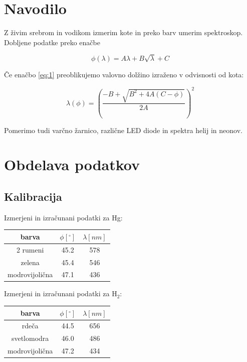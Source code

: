 \documentclass[12pt]{report}
\begin{document}
\chapter*{Navodilo}

Z živim srebrom in vodikom izmerim kote in preko barv umerim spektroskop. Dobljene podatke preko enačbe 

\begin{equation}\label{eq:1}
  \phi (\lambda) = A \lambda + B \sqrt{\lambda} +C
\end{equation}

Če enačbo \ref{eq:1} preoblikujemo valovno dolžino izraženo v odvisnosti od kota:

\begin{equation}
  \lambda(\phi) =\left(\frac{-B + \sqrt{B^2 + 4A(C - \phi)}}{2A}\right)^2
\end{equation}

Pomerimo tudi varčno žarnico, različne LED diode in spektra helij in neonov. 

\endgroup


\chapter*{Obdelava podatkov}

\section*{Kalibracija}

Izmerjeni in izračunani podatki za Hg: 

\begin{tabela}[H]
  \centering
  \begin{tabular}{|c|c|c|}\hline
    barva & $\phi [^{\circ}]$ & $\lambda [nm]$ \\ \hline
    2 rumeni & 45.2 & 578 \\
    zelena & 45.4 & 546 \\ 
    modrovijolična & 47.1 & 436 \\ \hline
  \end{tabular}
\end{tabela}

Izmerjeni in izračunani podatki za $\text{H}_2$: 

\begin{tabela}[H]
  \centering
  \begin{tabular}{|c|c|c|}\hline
    barva & $\phi [^{\circ}]$ & $\lambda [nm]$ \\ \hline
    rdeča & 44.5 & 656 \\
    svetlomodra & 46.0 & 486 \\ 
    modrovijolična & 47.2 & 434 \\ \hline
  \end{tabular}
\end{tabela}
\end{document}
